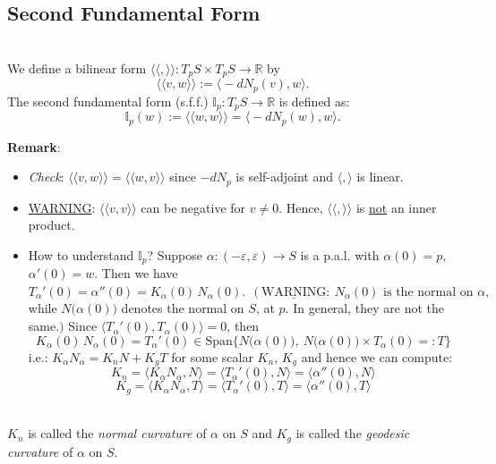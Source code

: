 \subsection{Second Fundamental Form}

\\
We define a bilinear form $\langle\langle,\rangle\rangle: T_pS\times T_pS\to\mathbb{R}$ by
\[
\langle\langle v, w\rangle\rangle := \big\langle -dN_p(v), w\big\rangle.
\]
The second fundamental form (s.f.f.) $\mathbb{I}_p: T_pS\to\mathbb{R}$ is defined as:
\[
\mathbb{I}_p(w) := \langle\langle w, w\rangle\rangle = \big\langle -dN_p(w), w\big\rangle.
\]

\noindent\textbf{Remark}:
\begin{itemize}
\item \textit{Check}: $\langle\langle v, w\rangle\rangle = \langle\langle w, v\rangle\rangle$ since $-dN_p$ is self-adjoint and $\langle,\rangle$ is linear.
\item \underline{WARNING}: $\langle\langle v, v\rangle\rangle$ can be negative for $v\neq 0$. Hence, $\langle\langle,\rangle\rangle$ is \underline{not} an inner product.
\item How to understand $\mathbb{I}_p$? Suppose $\alpha: (-\varepsilon, \varepsilon)\to S$ is a p.a.l. with $\alpha(0) = p$, $\alpha'(0) = w$. Then we have $T_\alpha'(0) = \alpha''(0) = K_\alpha(0)\,N_\alpha(0). \text{ }\big(\ \underline{\text{WARNING}}:\ N_\alpha(0)\text{ is the normal on }\alpha,$ while $N\big(\alpha(0)\big)$ denotes the normal on $S$, at $p$. In general, they are not the same.$\big)$ Since $\big\langle T_\alpha'(0), T_\alpha(0)\big\rangle = 0$, then
\[
K_\alpha(0)\,N_\alpha(0) = T_\alpha'(0)\in\mathrm{Span}\big\{N\big(\alpha(0)\big),\ N\big(\alpha(0)\big)\times T_\alpha(0) =: T\big\}
\]
i.e.: $K_\alpha N_\alpha = K_nN + K_gT$ for some scalar $K_n$, $K_g$ and hence we can compute:
\[
K_n = \big\langle K_\alpha N_\alpha, N\big\rangle = \big\langle T_\alpha'(0), N\big\rangle = \big\langle\alpha''(0), N\big\rangle
\]
\[
K_g = \big\langle K_\alpha N_\alpha, T\big\rangle = \big\langle T_\alpha'(0), T\big\rangle = \big\langle\alpha''(0), T\big\rangle
\]
\end{itemize}





\\
$K_n$ is called the \textit{normal curvature} of $\alpha$ on $S$ and $K_g$ is called the \textit{geodesic curvature} of $\alpha$ on $S$.

